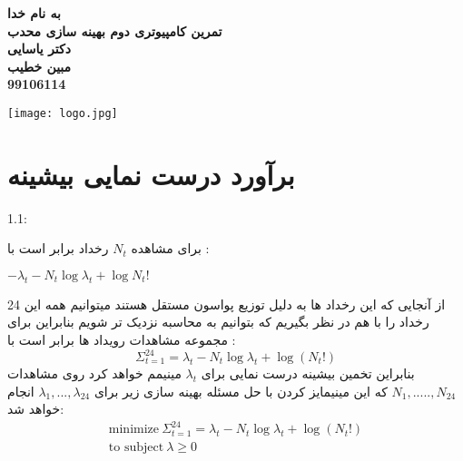 

\begin{titlepage}
\begin{center}

\Huge
\textbf{به نام خدا}\\[2cm]

\huge
\textbf{تمرین کامپیوتری دوم بهینه سازی محدب }\\[0.5cm]
\textbf{دکتر یاسایی}\\[1.5cm]

\Large
\textbf{مبین خطیب}\\[0.3cm]
\textbf{99106114}\\[0.5cm]







\begin{center}
    \texttt{[image: logo.jpg]}
\end{center}
\end{center}
\end{titlepage}




\newpage
\huge
\section{ برآورد درست نمایی بیشینه}
\large

1.1:

برای مشاهده $ N_t $ رخداد برابر است با :

$ -\lambda_t - N_t\log\lambda_t + \log N_t! $

 از آنجایی که این رخداد ها به دلیل توزیع پواسون مستقل هستند میتوانیم همه این 24 رخداد را با هم در نظر بگیریم که بتوانیم به محاسبه   نزدیک تر شویم بنابراین  برای مجموعه مشاهدات رویداد ها برابر است با :
\begin{equation}
\Sigma^{24}_{t=1} = \lambda_t - N_t \log\lambda_t + \log(N_t!)
\end{equation}
بنابراین تخمین بیشینه درست نمایی برای $ \lambda_t $  مینیمم خواهد کرد  روی مشاهدات $ N_1, .....,N_24 $  که این مینیمایز کردن با حل مسئله بهینه سازی زیر برای $ \lambda_1,...,\lambda_24 $ انجام خواهد شد:
\begin{equation}
\begin{aligned}
\text{minimize} \ \Sigma^{24}_{t=1} = \lambda_t - N_t \log\lambda_t + \log(N_t!)\\
 \text{to subject} \ \lambda \geq 0 \\
\end{aligned}
\end{equation}

